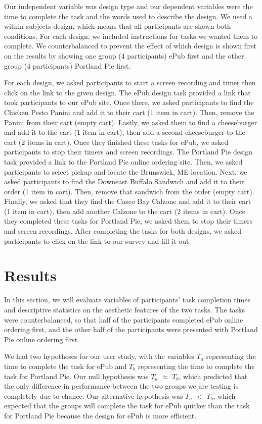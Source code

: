 \documentclass[runningheads]{llncs}
\begin{document}
Our independent variable was design type and our dependent variables were the time to complete the task and the words used to describe the design. We used a within-subjects design, which means that all participants are shown both conditions. For each design, we included instructions for tasks we wanted them to complete. We counterbalanced to prevent the effect of which design is shown first on the results by showing one group (4 participants) ePub first and the other group (4 participants) Portland Pie first.

For each design, we asked participants to start a screen recording and timer then click on the link to the given design. The ePub design task provided a link that took participants to our ePub site. Once there, we asked participants to find the Chicken Pesto Panini and add it to their cart (1 item in cart). Then, remove the Panini from their cart (empty cart). Lastly, we asked them to find a cheeseburger and add it to the cart (1 item in cart), then add a second cheeseburger to the cart (2 items in cart). Once they finished these tasks for ePub, we asked participants to stop their timers and screen recordings. The Portland Pie design task provided a link to the Portland Pie online ordering site. Then, we asked participants to select pickup and locate the Brunswick, ME location. Next, we asked participants to find the Downeast Buffalo Sandwich and add it to their order (1 item in cart). Then, remove that sandwich from the order (empty cart). Finally, we asked that they find the Casco Bay Calzone and add it to their cart (1 item in cart), then add another Calzone to the cart (2 items in cart). Once they completed these tasks for Portland Pie, we asked them to stop their timers and screen recordings. After completing the tasks for both designs, we asked participants to click on the link to our survey and fill it out. 

\section{Results}
In this section, we will evaluate variables of participants' task completion times and descriptive statistics on the aesthetic features of the two tasks. The tasks were counterbalanced, so that half of the participants completed ePub online ordering first, and the other half of the participants were presented with Portland Pie online ordering first. 

We had two hypotheses for our user study, with the variables $T_a$ representing the time to complete the task for ePub and $T_b$ representing the time to complete the task for Portland Pie. Our null hypothesis was $T_a$ $\approx$ $T_b$, which predicted that the only difference in performance between the two groups we are testing is completely due to chance. Our alternative hypothesis was $T_a$ $<$ $T_b$, which expected that the groups will complete the task for ePub quicker than the task for Portland Pie because the design for ePub is more efficient.
\end{document}
